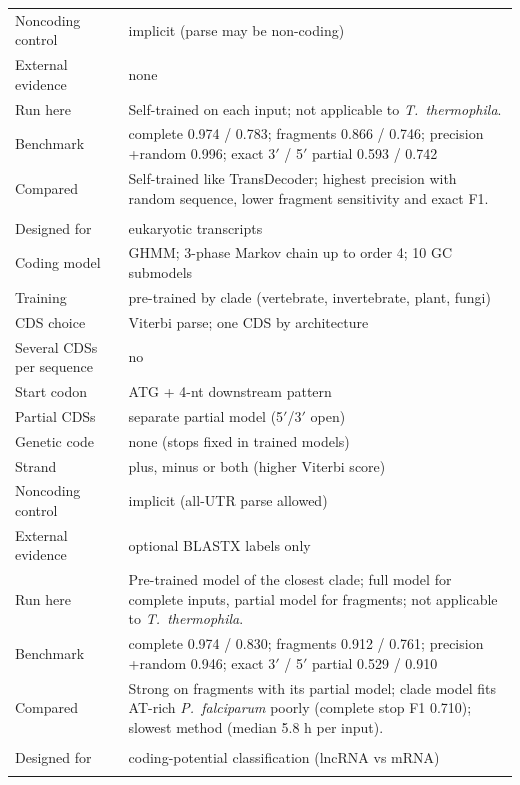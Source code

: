 \begin{longtable}{@{}>{\raggedright}p{3.2cm}>{\raggedright\arraybackslash}p{12.3cm}@{}}
Noncoding control & implicit (parse may be non-coding) \\*
External evidence & none \\*
Run here & Self-trained on each input; not applicable to \textit{T.~thermophila}. \\*
Benchmark & complete 0.974 / 0.783; fragments 0.866 / 0.746; precision +random 0.996; exact 3$'$ / 5$'$ partial 0.593 / 0.742 \\*
Compared & Self-trained like TransDecoder; highest precision with random sequence, lower fragment sensitivity and exact F1. \\
\addlinespace[6pt]
\multicolumn{2}{@{}l}{\textbf{CodAn} \citep{Nachtigall2021} (1.1)} \\*
Designed for & eukaryotic transcripts \\*
Coding model & GHMM; 3-phase Markov chain up to order 4; 10 GC submodels \\*
Training & pre-trained by clade (vertebrate, invertebrate, plant, fungi) \\*
CDS choice & Viterbi parse; one CDS by architecture \\*
Several CDSs per sequence & no \\*
Start codon & ATG + 4-nt downstream pattern \\*
Partial CDSs & separate partial model (5$'$/3$'$ open) \\*
Genetic code & none (stops fixed in trained models) \\*
Strand & plus, minus or both (higher Viterbi score) \\*
Noncoding control & implicit (all-UTR parse allowed) \\*
External evidence & optional BLASTX labels only \\*
Run here & Pre-trained model of the closest clade; full model for complete inputs, partial model for fragments; not applicable to \textit{T.~thermophila}. \\*
Benchmark & complete 0.974 / 0.830; fragments 0.912 / 0.761; precision +random 0.946; exact 3$'$ / 5$'$ partial 0.529 / 0.910 \\*
Compared & Strong on fragments with its partial model; clade model fits AT-rich \textit{P.~falciparum} poorly (complete stop F1 0.710); slowest method (median 5.8 h per input). \\
\addlinespace[6pt]
\multicolumn{2}{@{}l}{\textbf{CPAT} \citep{Wang2013} (3.0.5)} \\*
Designed for & coding-potential classification (lncRNA vs mRNA) \\*

\end{longtable}

